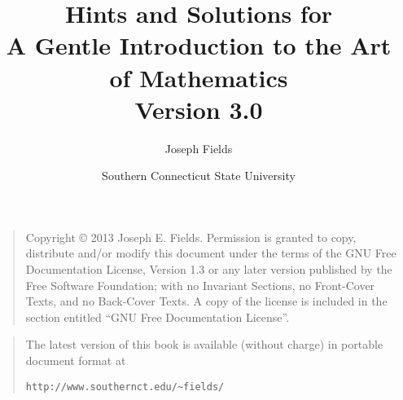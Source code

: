 \documentclass[dvips,12pt,twoside]{book}
\begin{document}
\frontmatter

\title{Hints and Solutions for \\
A Gentle Introduction to the Art of Mathematics\\ {\small Version 3.0}}
\author{Joseph Fields}
\date{Southern Connecticut State University}

\maketitle

\clearpage

\rule{0pt}{0pt}

\vfill

\begin{quote}
    Copyright \copyright{}  2013  Joseph E. Fields.
    Permission is granted to copy, distribute and/or modify this document
    under the terms of the GNU Free Documentation License, Version 1.3
    or any later version published by the Free Software Foundation;
    with no Invariant Sections, no Front-Cover Texts, and no Back-Cover Texts.
    A copy of the license is included in the section entitled ``GNU
    Free Documentation License''.
\end{quote}

\vfill

\begin{quote}
The latest version of this book is available (without charge) in portable document format at \newline
\rule{0pt}{0pt} \hspace{1in} \verb+http://www.southernct.edu/~fields/+
\end{quote}

\vfill

\clearpage

\mainmatter











{}%

\end{document}
